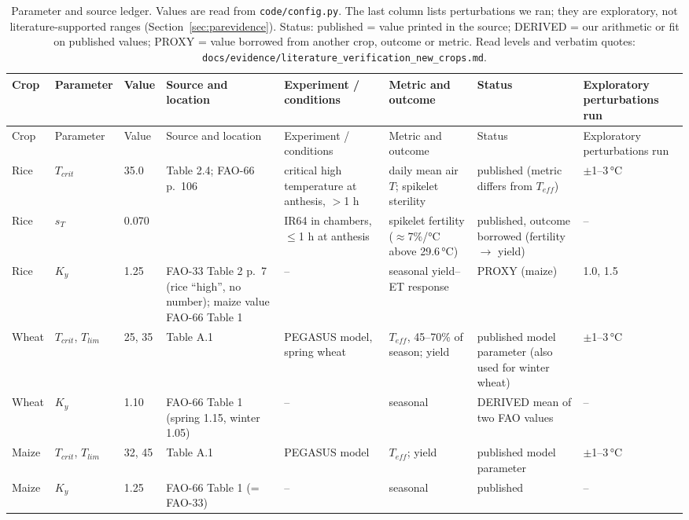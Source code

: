 {\scriptsize\begin{longtable}{L{0.091}L{0.098}L{0.098}L{0.171}L{0.183}L{0.140}L{0.122}L{0.098}}
\caption[Parameter and source ledger]{Parameter and source ledger. Values are read from \texttt{code/config.py}. The last column lists perturbations we ran; they are exploratory, not literature-supported ranges (Section~\ref{sec:parevidence}). Status: published = value printed in the source; DERIVED = our arithmetic or fit on published values; PROXY = value borrowed from another crop, outcome or metric. Read levels and verbatim quotes: \texttt{docs/evidence/literature\_verification\_new\_crops.md}.}\label{tab:ledger}\\
\toprule
Crop & Parameter & Value & Source and location & Experiment / conditions & Metric and outcome & Status & Exploratory perturbations run \\
\midrule\endfirsthead
\toprule
Crop & Parameter & Value & Source and location & Experiment / conditions & Metric and outcome & Status & Exploratory perturbations run \\
\midrule\endhead
\bottomrule\endfoot
Rice & $T_{crit}$ & 35.0 & \citet{yoshida1981} Table 2.4; FAO-66 p.~106 & critical high temperature at anthesis, $>$1 h & daily mean air $T$; spikelet sterility & published (metric differs from $T_{eff}$) & $\pm$1--3\,\si{\celsius} \\
Rice & $s_T$ & 0.070 & \citet{jagadish2007} & IR64 in chambers, $\le$1 h at anthesis & spikelet fertility ($\approx$7\%/\si{\celsius} above 29.6\,\si{\celsius}) & published, outcome borrowed (fertility $\to$ yield) & -- \\
Rice & $K_y$ & 1.25 & FAO-33 Table 2 p.~7 (rice ``high'', no number); maize value FAO-66 Table 1 & -- & seasonal yield--ET response & PROXY (maize) & 1.0, 1.5 \\
Wheat & $T_{crit}$, $T_{lim}$ & 25, 35 & \citet{deryng2014} Table A.1 & PEGASUS model, spring wheat & $T_{eff}$, 45--70\% of season; yield & published model parameter (also used for winter wheat) & $\pm$1--3\,\si{\celsius} \\
Wheat & $K_y$ & 1.10 & FAO-66 Table 1 (spring 1.15, winter 1.05) & -- & seasonal & DERIVED mean of two FAO values & -- \\
Maize & $T_{crit}$, $T_{lim}$ & 32, 45 & \citet{deryng2014} Table A.1 & PEGASUS model & $T_{eff}$; yield & published model parameter & $\pm$1--3\,\si{\celsius} \\
Maize & $K_y$ & 1.25 & FAO-66 Table 1 (= FAO-33) & -- & seasonal & published & -- \\

\end{longtable}}
